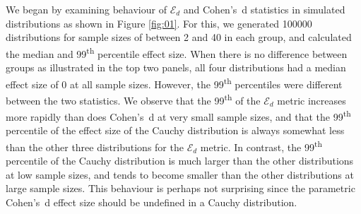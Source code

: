 \documentclass{bioinfo}
\begin{document}
We began by examining behaviour of   $\mathcal{E}_{d}$ and Cohen's~d statistics in simulated distributions as shown in Figure \ref{fig:01}. For this, we generated 100000 distributions for sample sizes  of between 2 and 40 in each group, and calculated the median and 99\textsuperscript{th} percentile effect size. When there is no difference between groups as illustrated in the top two panels, all four distributions had a median effect size of 0 at all sample sizes. However, the  99\textsuperscript{th} percentiles were different between the two statistics. We observe that the 99\textsuperscript{th} of the $\mathcal{E}_{d}$ metric increases more rapidly than does Cohen's~d at very small sample sizes, and that the  99\textsuperscript{th} percentile of the effect size of the Cauchy distribution is always somewhat less than the other three distributions for the $\mathcal{E}_{d}$ metric. In contrast, the  99\textsuperscript{th} percentile of the Cauchy distribution is much larger than the other distributions at low sample sizes, and tends to become smaller than the other distributions at large sample sizes. This behaviour is perhaps not surprising since the parametric Cohen's~d effect size should be undefined in a Cauchy distribution. 
\end{document}
